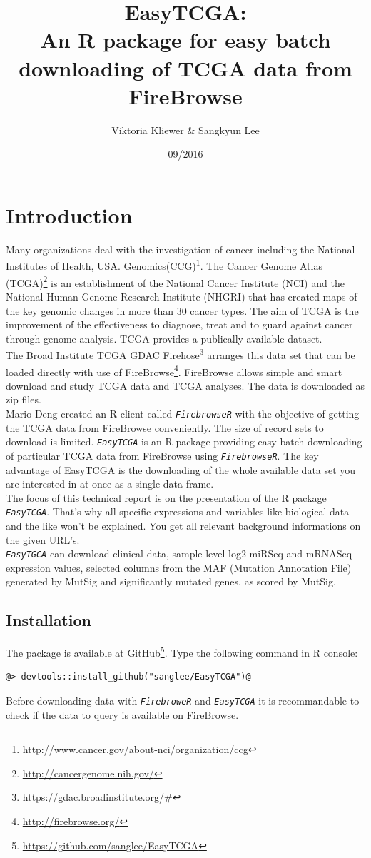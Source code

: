 \documentclass{TechReport}
\title{EasyTCGA:\\ An R package for easy batch downloading of TCGA data from FireBrowse}
\author{Viktoria Kliewer \& Sangkyun Lee}
\date{09/2016}        %
\begin{document}
\makesfbtitlepage

\section{Introduction}
Many organizations deal with the investigation of cancer including the National
Institutes of Health, USA.
Genomics(CCG)\footnote{\url{http://www.cancer.gov/about-nci/organization/ccg}}. 
The Cancer Genome Atlas (TCGA)\footnote{\url{http://cancergenome.nih.gov/}} is an
establishment of the
National Cancer Institute (NCI) and the National Human Genome Research Institute
(NHGRI)
that has created maps of the key genomic changes in more than 30 cancer types. The
aim of TCGA is the improvement
of the effectiveness to diagnose, treat and to guard against cancer through genome
analysis. TCGA provides a
publically available dataset.\\
The Broad Institute TCGA GDAC
Firehose\footnote{\url{https://gdac.broadinstitute.org/#}} arranges this
data set that can be loaded directly with use of
FireBrowse\footnote{\url{http://firebrowse.org/}}. FireBrowse allows
simple and smart download and study TCGA data and TCGA analyses. The data is
downloaded as zip files.\\
Mario Deng created an R client called \texttt{\em FirebrowseR} with the objective of
getting the TCGA data from FireBrowse conveniently.
The size of record sets to download is limited. \texttt{\em EasyTCGA} is an R
package providing easy batch downloading of particular
TCGA data from FireBrowse using \texttt{\em FirebrowseR}. The key advantage of
EasyTCGA is the downloading of the whole available
data set you are interested in at once as a single data frame. \\
The focus of this technical report is on the presentation of the R package
\texttt{\em EasyTCGA}. That's why all specific expressions and variables 
like biological data and the like won't be explained. You get all relevant
background informations on the given URL's.\\
\texttt{\em EasyTGCA} can download clinical data, sample-level log2 miRSeq and
mRNASeq expression values, selected columns
from the MAF (Mutation Annotation File) generated by MutSig and significantly
mutated genes, as scored by MutSig.\\

\subsection{Installation}
The package is available at
GitHub\footnote{\url{https://github.com/sanglee/EasyTCGA}}. Type the following
command in R console:
\begin{lstlisting}[style=base]
@> devtools::install_github("sanglee/EasyTCGA")@
\end{lstlisting}
Before downloading data with \texttt{\em FirebroweR} and \texttt{\em EasyTCGA} it is
recommandable to check if the data to query is available 
on FireBrowse\footnotemark[4].\\
\end{document}
